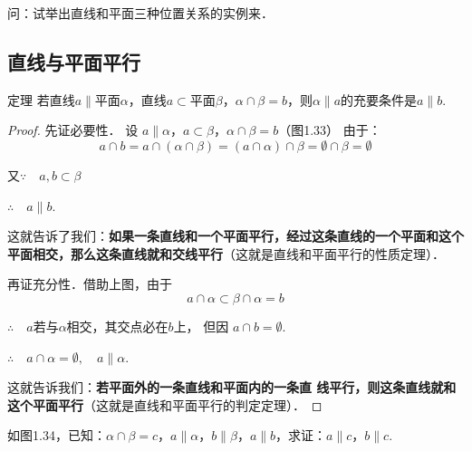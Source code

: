问：试举出直线和平面三种位置关系的实例来．

\subsection{直线与平面平行}
\begin{blk}
  {定理}
  若直线$a\parallel$平面$\alpha$，直线$a\subset$平面$\beta$，$\alpha\cap \beta=b$，则$\alpha\parallel a$的充要条件是$a\parallel b$.
\end{blk}

\begin{proof}
先证必要性．
设 $a\parallel\alpha$，$a\subset \beta$，$\alpha\cap\beta=b$（图1.33）
由于：
\[a\cap b=a\cap(\alpha\cap \beta)=(a\cap\alpha)\cap \beta=\emptyset\cap\beta=\emptyset\]

又$\because\quad a,b\subset\beta$

$\therefore\quad  a\parallel b$.

这就告诉了我们：\textbf{如果一条直线和一个平面平行，经过这条直线的一个平面和这个平面相交，那么这条直线就和交线平行}（这就是直线和平面平行的性质定理）．

\begin{figure}[htp]
  \centering
{}
  \caption{}
\end{figure}

再证充分性．借助上图，由于
\[a\cap\alpha\subset \beta\cap\alpha=b\]

$\therefore\quad a$若与$\alpha$相交，其交点必在$b$上，
但因 $a\cap b=\emptyset$.

$\therefore\quad a\cap\alpha=\emptyset,\quad a\parallel\alpha$.

这就告诉我们：\textbf{若平面外的一条直线和平面内的一条直
线平行，则这条直线就和这个平面平行}（这就是直线和平面平行的判定定理）．
\end{proof}


\begin{example}
  如图1.34，已知：$\alpha\cap\beta=c$，$a\parallel \alpha$，$b\parallel \beta$，$a\parallel b$，求证：$a\parallel c$，$b\parallel c$.
\end{example}


